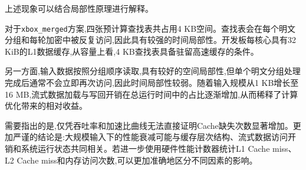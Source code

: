 上述现象可以结合局部性原理进行解释。

对于\texttt{xbox\_merged}方案,四张预计算查找表共占用4 KB空间。查找表会在每个明文分组和每轮加密中被反复访问,因此具有较强的时间局部性。开发板每核心具有32 KiB的L1数据缓存,从容量上看,4 KB查找表具备驻留高速缓存的条件。

另一方面,输入数据按照分组顺序读取,具有较好的空间局部性,但单个明文分组处理完成后通常不会立即再次访问,因此时间局部性较弱。随着输入规模从1 KB增长至16 MB,流式数据加载与写回开销在总运行时间中的占比逐渐增加,从而稀释了计算优化带来的相对收益。

需要指出的是,仅凭吞吐率和加速比曲线无法直接证明Cache缺失次数显著增加。更加严谨的结论是:大规模输入下的性能衰减可能与缓存层次结构、流式数据访问开销和系统运行状态共同相关。若进一步使用硬件性能计数器统计L1 Cache miss、L2 Cache miss和内存访问次数,可以更加准确地区分不同因素的影响。


